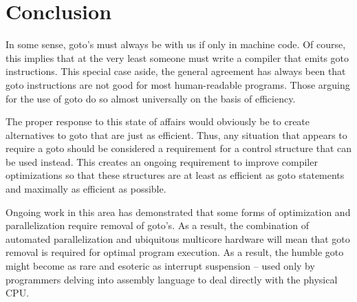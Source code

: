\documentclass[letterpaper,10pt,twocolumn]{article}
\begin{document}
\section{Conclusion}

In some sense, goto's must always be with us if only in machine code.  Of
course, this implies that at the very least someone must write a compiler
that emits goto instructions.  This special case aside, the general agreement
has always been that goto instructions are not good for most human-readable
programs.  Those arguing for the use of goto do so almost universally on
the basis of efficiency.

The proper response to this state of affairs would obviously be to create
alternatives to goto that are just as efficient.  Thus, any situation that
appears to require a goto should be considered a requirement for a control
structure that can be used instead.  This creates an ongoing requirement
to improve compiler optimizations so that these structures are at least as
efficient as goto statements and maximally as efficient as possible.

Ongoing work in this area has demonstrated that some forms of optimization
and parallelization require removal of goto's.  As a result, the combination
of automated parallelization and ubiquitous multicore hardware will mean
that goto removal is required for optimal program execution.   As a result,
the humble goto might become as rare and esoteric as interrupt suspension --
used only by programmers delving into assembly language to deal directly with the
physical CPU.



\nocite{*} %
\printbibliography
\end{document}
